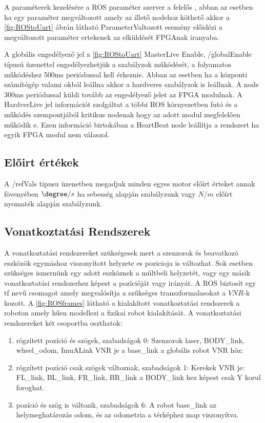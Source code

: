A paraméterek kezelésére a ROS paraméter szerver a felelős \cite{parameterserver}, abban az esetben ha egy paraméter megváltozott amely az illető nodehoz köthető akkor a \ref{fig:ROStoUart} ábrán látható ParameterValtozott esemény előidézi a  megváltozott paraméter ertekenek az elküldését  FPGAnak iranyaba.

A globális engedélyező jel a \ref{fig:ROStoUart} MasterLive Enable,  /globalEnable típusú üzenettel engedélyezhetjük a szabályzok működését, a folyamatos működéshez 500ms periódussal kell érkeznie. Abban az esetben ha a központi számítógép valami okból leállna akkor a hardveres szabályzok is leállnak. A node 300ms periódussal küldi tovább az engedélyező jelet az FPGA modulnak. A HardverLive jel információt szolgáltat a többi ROS környezetben futó és a működés szempontjából kritikus nodenak hogy az adott modul megfelelően működik e. Ezen információ birtokában a HeartBeat node leállítja a rendszert ha egyik FPGA modul nem válaszol.

\renewcommand{\img}{SajatRobot/ROS/NodeUML.jpg}
\renewcommand{\sources}{*}
\renewcommand{\captionn}{ROS integrálása Uart protokolhoz.}
\renewcommand{\figlabel}{ROStoUart}


\subsection{Előirt értékek}
A /refVals tipusu üzenetben megadjuk minden egyes motor előírt érteket annak fövenyében $\degree/s$ ha sebesség alapján szabályzunk vagy $N/m$ előírt nyomaték alapján szabályzunk.


\subsection{Vonatkoztatási Rendszerek }
A  vonatkoztatási rendszereket szükségesek mert a szenzorok és beavatkozó eszközök egymáshoz viszonyított helyzete es pozicioja is változhat. Sok esetben szükséges ismernünk egy adott eszköznek a múltbeli helyzetét, vagy egy másik vonatkoztatási rendszerhez képest a pozícióját vagy irányát. A ROS biztosít egy tf \cite{rosTF} nevű csomagot amely megvalósítja a szűkséges transzformalasokat a $VNR$-k kozott. 
A \ref{fig:ROSframes} látható a kialakított vonatkoztatási rendszerek a roboton amely hűen modellezi a fizikai robot kialakítását.
A vonatkoztatási rendszereket két csoportba oszthatok:

\begin{enumerate}[label=(\alph*)]
\item rögzített pozíció és szögek, szabadságok 0:
Szenzorok laser, BODY\_link, wheel\_odom, ImuALink VNR je a base\_link a globális robot VNR höz:
\item rögzített pozíció csak szögek változnak, szabadságok 1: Kerekek VNR je: FL\_link, BL\_link, FR\_link, BR\_link a BODY\_link hez képest csak Y korul foroghat.
\item pozíció és szög is változik, szabadságok 6:
A robot base\_link az helymeghatározás odom, és az odometria a térképhez map viszonyítva.
\end{enumerate}


